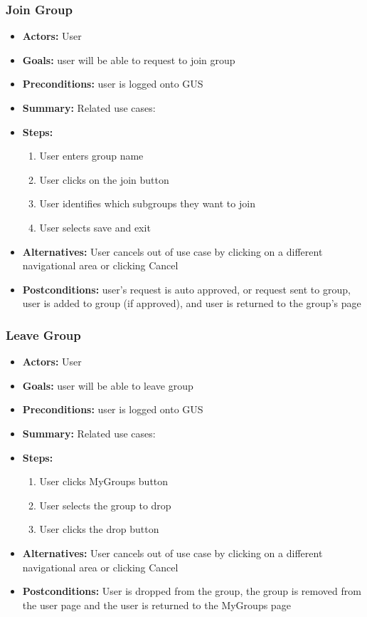          \subsubsection{Join Group}
			\begin{itemize}
				\item{\textbf{Actors:} User}
				\item{\textbf{Goals:} user will be able to request to join group}
				\item{\textbf{Preconditions:} user is logged onto GUS}
				\item{\textbf{Summary:} Related use cases: }
				\item{\textbf{Steps:}
				\begin{enumerate}
					\item{User enters group name}
					\item{User clicks on the join button}
					\item{User identifies which subgroups they want to join}
					\item{User selects save and exit}
				\end{enumerate}
				}
				\item{\textbf{Alternatives:} User cancels out of use case by clicking on a different navigational area or clicking Cancel}
				\item{\textbf{Postconditions:} user's request is auto approved, or request sent to group, user is added to group (if approved), and user is returned to the group's page}
			\end{itemize}
         \subsubsection{Leave Group}
			\begin{itemize}
				\item{\textbf{Actors:} User}
				\item{\textbf{Goals:} user will be able to leave group}
				\item{\textbf{Preconditions:} user is logged onto GUS}
				\item{\textbf{Summary:} Related use cases: }
				\item{\textbf{Steps:}
				\begin{enumerate}
					\item{User clicks MyGroups button}
					\item{User selects the group to drop}
					\item{User clicks the drop button}
				\end{enumerate}
				}
				\item{\textbf{Alternatives:} User cancels out of use case by clicking on a different navigational area or clicking Cancel}
				\item{\textbf{Postconditions:} User is dropped from the group, the group is removed from the user page and the user is returned to the MyGroups page}
			\end{itemize}
